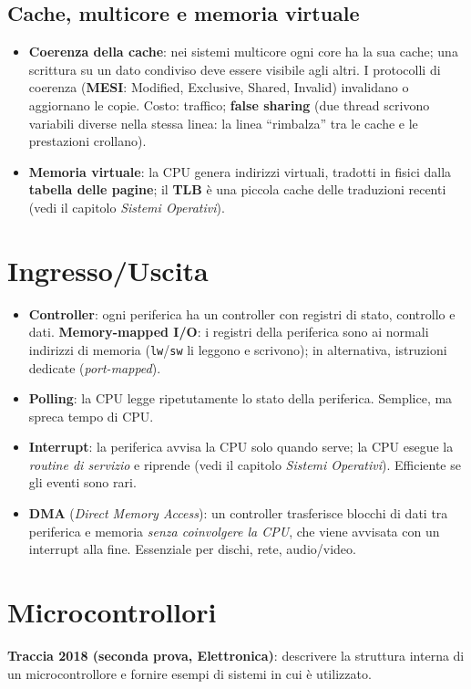 \subsection{Cache, multicore e memoria virtuale}
\begin{itemize}
    \item \textbf{Coerenza della cache}: nei sistemi multicore ogni core ha la sua cache; una scrittura su un dato condiviso deve essere visibile agli altri. I protocolli di coerenza (\textbf{MESI}: Modified, Exclusive, Shared, Invalid) invalidano o aggiornano le copie. Costo: traffico; \textbf{false sharing} (due thread scrivono variabili diverse nella stessa linea: la linea ``rimbalza'' tra le cache e le prestazioni crollano).
    \item \textbf{Memoria virtuale}: la CPU genera indirizzi virtuali, tradotti in fisici dalla \textbf{tabella delle pagine}; il \textbf{TLB} è una piccola cache delle traduzioni recenti (vedi il capitolo \emph{Sistemi Operativi}).
\end{itemize}

\section{Ingresso/Uscita}
\begin{itemize}
    \item \textbf{Controller}: ogni periferica ha un controller con registri di stato, controllo e dati. \textbf{Memory-mapped I/O}: i registri della periferica sono ai normali indirizzi di memoria (\texttt{lw}/\texttt{sw} li leggono e scrivono); in alternativa, istruzioni dedicate (\emph{port-mapped}).
    \item \textbf{Polling}: la CPU legge ripetutamente lo stato della periferica. Semplice, ma spreca tempo di CPU.
    \item \textbf{Interrupt}: la periferica avvisa la CPU solo quando serve; la CPU esegue la \emph{routine di servizio} e riprende (vedi il capitolo \emph{Sistemi Operativi}). Efficiente se gli eventi sono rari.
    \item \textbf{DMA} (\emph{Direct Memory Access}): un controller trasferisce blocchi di dati tra periferica e memoria \emph{senza coinvolgere la CPU}, che viene avvisata con un interrupt alla fine. Essenziale per dischi, rete, audio/video.
\end{itemize}

\section{Microcontrollori}
\textbf{Traccia 2018 (seconda prova, Elettronica)}: descrivere la struttura interna di un microcontrollore e fornire esempi di sistemi in cui è utilizzato.

